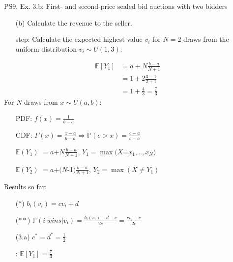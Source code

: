 \begin{frame}{PS9, Ex. 3.b: First- and second-price sealed bid auctions with two bidders}
    \begin{multicols}{2}
      \begin{itemize}
        \item[(b)] Calculate the revenue to the seller.
        \item[\nth{1} step:] Calculate the expected highest value $v_i$ for $N=2$ draws from the uniform distribution $v_i\sim U(1,3)$:
      \end{itemize}
      \vspace{-8pt}
      \begin{align*}
        \mathbb{E}[Y_1]&=a+N\frac{b-a}{N+1}\\
                       &=1+2\frac{3-1}{2+1}\\
                       &=1+\frac{4}{3}=\frac{7}{3}
      \end{align*}
      \vfill\null\columnbreak
      For $N$ draws from $x\sim U(a, b):$
      \vspace{-6pt}
      \begin{enumerate}
        \item[PDF:] $f(x)=\frac{1}{b-a}$
        \item[CDF:] $F(x)=\frac{x-a}{b-a}\Rightarrow\mathbb{P}(c>x)=\frac{c-a}{b-a}$
        \item[$\mathbb{E}(Y_1)$] $=a$+$N\frac{b-a}{N+1}$, $Y_1=\max(X$=$x_1,..,x_N)$
        \item[$\mathbb{E}(Y_2)$] $=a$+$(N$-1$)\frac{b-a}{N+1}$, $Y_2=\max(X\neq Y_1)$
      \end{enumerate}
      \vspace{-6pt}
      Results so far:
      \vspace{-6pt}
      \begin{itemize}
        \item[($*$)]  $b_i(v_i) = cv_i+d$
        \item[($**$)] $\mathbb{P}(i\ wins|v_i)=\frac{b_i(v_i)-d-c}{2c}=\frac{cv_i-c}{2c}$
        \item[(3.a)]    $c^*=d^*=\frac{1}{2}$
        \item[\nth{1}:] $\mathbb{E}[Y_1]=\frac{7}{3}$
      \end{itemize}
      \vfill\null
    \end{multicols}
\end{frame}
